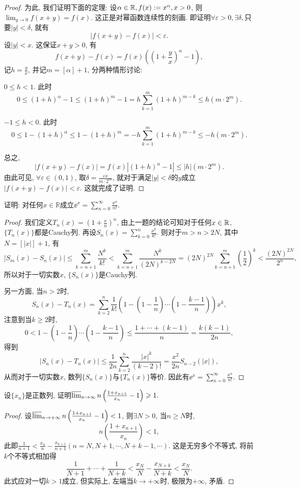 \begin{quizb}
\begin{proof}
为此, 我们证明下面的定理: 设\(\alpha\in\mathbb{R},f(x):=x^\alpha,x>0\), 则\(\lim_{y\rightarrow 0}f(x+y)=f(x).\) 这正是对幂函数连续性的刻画. 即证明\(\forall\varepsilon>0,\exists\delta,\)只要\(|y|<\delta\), 就有\[\left|f(x+y)-f(x)\right|<\varepsilon.\]设\(|y|<x\). 这保证\(x+y>0\), 有\[f(x+y)-f(x)=f(x)\left(\left(1+\frac{y}{x}\right)^\alpha-1\right),\]记\(h=\frac{y}{x}\), 并记\(m=[\alpha]+1\), 分两种情形讨论:\begin{compactenum}[(1)]
\item \(0\leqslant h<1.\) 此时\[0\leqslant (1+h)^\alpha-1\leqslant(1+h)^m-1=h\sum_{k=1}^{m}(1+h)^{m-k}\leqslant h\left(m\cdot 2^m\right).\]
\item \(-1\leqslant h<0.\) 此时\[0\leqslant 1-(1+h)^\alpha\leqslant 1-(1+h)^m=-h\sum_{k=1}^{m}(1+h)^{m-k}\leqslant -h(m\cdot 2^m).\]
\end{compactenum}
总之,\[\left|f(x+y)-f(x)\right|=f(x)\left|(1+h)^\alpha-1\right|\leqslant|h|\left(m\cdot 2^m\right).\]由此可见, \(\forall \varepsilon\in(0,1)\), 取\(\delta=\frac{\varepsilon x}{m\cdot 2^m}\), 就对于满足\(|y|<\delta\)的\(y\)成立\(|f(x+y)-f(x)|<\varepsilon\). 这就完成了证明.
\end{proof}
\woe 证明: 对任何\(x\in\mathbb{R}\)成立\(\ee^x=\sum_{n=0}^{\infty}\frac{x^n}{n!}\).
\begin{proof}
我们定义\(T_n(x)=\left(1+\frac{x}{n}\right)^n\), 由上一题的结论可知对于任何\(x\in\mathbb{R}\), \(\{T_n(x)\}\)都是Cauchy列. 再设\(S_n(x)=\sum_{k=0}^{n}\frac{x^k}{k!}\). 则对于\(m>n>2N\), 其中\(N=\left[|x|\right]+1\), 有\[\left|S_m(x)-S_n(x)\right|\leqslant\sum_{k=n+1}^{m}\frac{N^k}{k!}<\sum_{k=n+1}^{m}\frac{N^k}{(2N)^{k-2N}}=(2N)^{2N}\sum_{k=n+1}^{m}\left(\frac{1}{2}\right)^k<\frac{(2N)^{2N}}{2^n},\]所以对于一切实数\(x\), \(\{S_n(x)\}\)是Cauchy列.

另一方面, 当\(n>2\)时,\[S_n(x)-T_n(x)=\sum_{k=2}^{n}\frac{1}{k!}\left(1-\left(1-\frac{1}{n}\right)\cdots\left(1-\frac{k-1}{n}\right)\right)x^k,\]注意到当\(k\geqslant 2\)时,\[0<1-\left(1-\frac{1}{n}\right)\cdots\left(1-\frac{k-1}{n}\right)\leqslant\frac{1+\cdots+(k-1)}{n}=\frac{k(k-1)}{2n},\]得到\[\left|S_n(x)-T_n(x)\right|\leqslant\frac{1}{2n}\sum_{k=2}^{n}\frac{|x|^k}{(k-2)!}=\frac{x^2}{2n}S_{n-2}(|x|),\]从而对于一切实数\(x\), 数列\(\{S_n(x)\}\)与\(\{T_n(x)\}\)等价. 因此有\(\ee^x=\sum_{n=0}^{\infty}\frac{x^n}{n!}\).
\end{proof}
\woe 设\(\{x_n\}\)是正数列, 证明\(\varlimsup_{n\rightarrow\infty}n\left(\frac{1+x_{n+1}}{x_n}-1\right)\geqslant 1.\)
\begin{proof}
设\(\varlimsup_{n\rightarrow+\infty}n\left(\frac{1+x_{n+1}}{x_n}-1\right)<1\), 则\(\exists N>0\), 当\(n\geqslant N\)时,\[n\left(\frac{1+x_{n+1}}{x_n}\right)<1,\]此即\(\frac{1}{n+1}<\frac{x_n}{n}-\frac{x_{n+1}}{n+1}(n=N,N+1,\cdots,N+k-1,\cdots)\). 这是无穷多个不等式, 将前\(k\)个不等式相加得\[\frac{1}{N+1}+\cdots+\frac{1}{N+k}<\frac{x_N}{N}-\frac{x_{N+k}}{N+k}<\frac{x_N}{N}.\]此式应对一切\(k>1\)成立, 但实际上, 左端当\(k\rightarrow+\infty\)时, 极限为\(+\infty\), 矛盾.


\end{proof}
\end{quizb}
